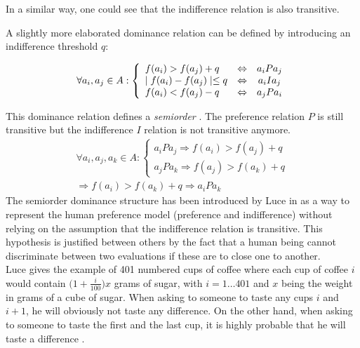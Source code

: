 In a similar way, one could see that the indifference relation is also transitive.

A slightly more elaborated dominance relation can be defined by introducing an indifference threshold $q$:

\begin{equation}
    \forall a_i, a_j \in A: \left\{
        \begin{array}[]{l c c c c}
            f(a_i)  >  f(a_j) + q           &\Leftrightarrow & a_iPa_j \\
            \mid f(a_i) - f(a_j) \mid  \leq  q  &\Leftrightarrow & a_iIa_j \\
            f(a_i)  <  f(a_j)  -q             &\Leftrightarrow & a_jPa_i \\
        \end{array}
        \right .
    \label{eq:dominance_relation_monocriterion_ind_threshold}
\end{equation}

This dominance relation defines a \textit{semiorder} \cite{Vin92}. The preference relation $P$ is still transitive but the indifference $I$ relation is not transitive anymore.
\begin{equation}
    \begin{split}
    \forall a_i, a_j, a_k \in A: \left \{
        \begin{array}{l}
            a_iPa_j \Rightarrow f(a_i) > f(a_j)+q \\
            a_jPa_k \Rightarrow f(a_j) > f(a_k)+q
        \end{array} \right . \\
        \Rightarrow f(a_i) > f(a_k)+q \Rightarrow a_iPa_k
    \end{split}
    \label{eqn:transitivity_preference_monocriterion_indiff_threshold}
\end{equation}
The semiorder dominance structure has been introduced by Luce in \cite{Luce1956} as a way to represent the human preference model (preference and indifference) without relying on the assumption that the indifference relation is transitive.
This hypothesis is justified between others by the fact that a human being cannot discriminate between two evaluations if these are to close one to another. \\
Luce gives the example of 401 numbered cups of coffee where each cup of coffee $i$ would contain $\big( 1+ \frac{i}{100} \big) x$ grams of sugar, with $i=1\dots401$ and $x$ being the weight in grams of a cube of sugar.
When asking to someone to taste any cups $i$ and $i+1$, he will obviously not taste any difference.
On the other hand, when asking to someone to taste the first and the last cup, it is highly probable that he will taste a difference \cite{Luce1956}.

